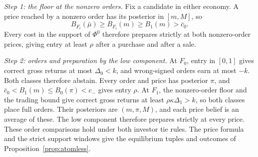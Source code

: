 
\emph{Step 1: the floor at the nonzero orders.} Fix a candidate in either economy. A price reached by a
nonzero order has its posterior in \([m,M]\), so
\[
B_{F_i}(\bar\mu)\ge B_{F_i}(m)\ge B_1(m)>\bar c_0.
\]
Every cost in the support of \(\Phi^0\) therefore prepares strictly at both nonzero-order prices, giving entry
at least \(\rho\) after a purchase and after a sale.

\emph{Step 2: orders and preparation by the low component.} At \(F_0\), entry in \([0,1]\) gives correct gross
returns at most \(\Delta_0<k\), and wrong-signed orders earn at most \(-k\). Both classes therefore abstain.
Every order and price has posterior \(\pi\), and
\(\bar c_0<B_1(m)\le B_0(\pi)<c_-\) gives entry \(\rho\).
At \(F_1\), the nonzero-order floor and the trading bound give correct gross returns at least
\(\rho\kappa\Delta_1>k\), so both classes place full orders. Their posteriors are \((m,\pi,M)\), and each price
belief is an average of these. The low component therefore prepares strictly at every price. These order
comparisons hold under both investor tie rules. The price formula and the strict support windows give the
equilibrium tuples and outcomes of Proposition~\ref{prop:atomless}.
